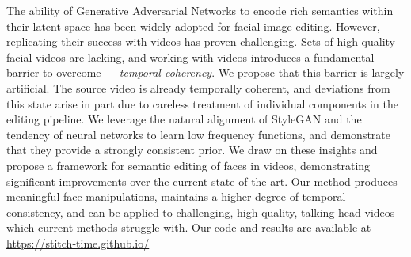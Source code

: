 

The ability of Generative Adversarial Networks to encode rich semantics within their latent space has been widely adopted for facial image editing. However, replicating their success with videos has proven challenging. Sets of high-quality facial videos are lacking, and working with videos introduces a fundamental barrier to overcome --- \textit{temporal coherency}. We propose that this barrier is largely artificial. The source video is already temporally coherent, and deviations from this state arise in part due to careless treatment of individual components in the editing pipeline. We leverage the natural alignment of StyleGAN and the tendency of neural networks to learn low frequency functions, and demonstrate that they provide a strongly consistent prior. We draw on these insights and propose a framework for semantic editing of faces in videos, demonstrating significant improvements over the current state-of-the-art. Our method produces meaningful face manipulations, maintains a higher degree of temporal consistency, and can be applied to challenging, high quality, talking head videos which current methods struggle with. Our code and results are available at \url{https://stitch-time.github.io/}